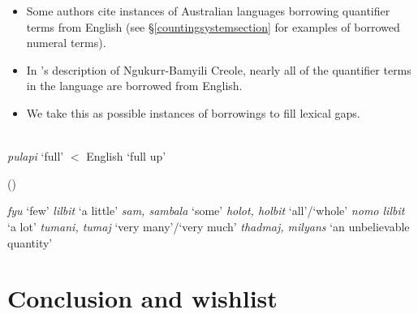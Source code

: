 \documentclass{article}
\begin{document}
\begin{itemize}
\item Some authors cite instances of Australian languages borrowing quantifier terms from English (see \S\ref{countingsystemsection} for examples of borrowed numeral terms).
\item In \cite{sandefur79}'s description of Ngukurr-Bamyili Creole, nearly all of the quantifier terms in the language are borrowed from English.
\item We take this as possible instances of borrowings to fill lexical gaps.
\end{itemize}

\begin{exe} 
   \\
  {\it pulapi} `full' $<$ English `full up'

   (\citealt[100]{sandefur79})
  \begin{xlist}
    \ex \textit{fyu} `few'
    \ex \textit{lilbit} `a little'
    \ex \textit{sam, sambala} `some'
    \ex \textit{holot, holbit} `all'/`whole'
    \ex \textit{nomo lilbit} `a lot'
    \ex \textit{tumani, tumaj} `very many'/`very much'
    \ex \textit{thadmaj, milyans} `an unbelievable quantity'
  \end{xlist}
\end{exe}

\section{Conclusion and wishlist}
\end{document}
